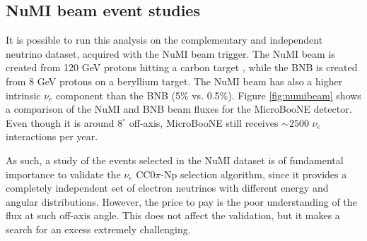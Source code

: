 

\subsection{NuMI beam event studies}
It is possible to run this analysis on the complementary and independent neutrino dataset, acquired with the NuMI beam trigger. The NuMI beam is created from 120 GeV protons hitting a carbon target \cite{Adamson:2015dkw}, while the BNB is created from 8 GeV protons on a beryllium target. The NuMI beam has also a higher intrinsic $\nu_{e}$ component than the BNB (5\% vs. 0.5\%). Figure \ref{fig:numibeam} shows a comparison of the NuMI and BNB beam fluxes for the MicroBooNE detector. Even though it is around $8^{\circ}$ off-axis, MicroBooNE still receives $\sim2500$ $\nu_{e}$ interactions per year. 

As such, a study of the events selected in the NuMI dataset is of fundamental importance to validate the $\nu_{e}$ CC0$\pi$-Np selection algorithm, since it provides a completely independent set of electron neutrinos with different energy and angular distributions. 
However, the price to pay is the poor understanding of the flux at such off-axis angle. This does not affect the validation, but it makes a search for an excess extremely challenging. 

